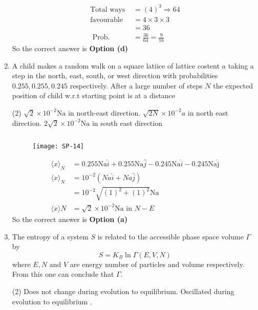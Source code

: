 \begin{enumerate}
	\begin{answer}
		\begin{align*}
		\text{Total ways }&=(4)^{3} \Rightarrow 64\\
		\text{favourable }&=4 \times 3 \times 3\\
		&=36\\
		\text { Prob. }&=\frac{36}{64}=\frac{9}{16}
		\end{align*}
		So the correct answer is \textbf{Option (d)}
	\end{answer}
	\item A child makes a random walk on a square latiice of lattice costent $a$ taking a step in the north, east, south, or west direction with probabilities $0.255,0.255,0.245$ respectively. After a large number of steps $N$ the expected position of child w.r.t starting point is at a distance
	\begin{tasks}(2)
		\task[\textbf{a.}]$\sqrt{2} \times 10^{-2} \mathrm{Na}$ in north-east direction.
		\task[\textbf{b.}]$\sqrt{2 N} \times 10^{-2} a$  in north east direction.
		\task[\textbf{c.}]$2 \sqrt{2} \times 10^{-2} \mathrm{Na}$ in south east direction
	\end{tasks}
	\begin{answer}$\left. \right. $
		\begin{figure}[H]
			\centering
			\texttt{[image: SP-14]}
		\end{figure}
		\begin{align*}
		\langle x\rangle_{N}&=0.255 \mathrm{Na}\hat{i}
		+0.255 \mathrm{Na} \hat{j}-0.245 \mathrm{Na} \hat{i}
		-0.245 \mathrm{Na\hat{j}}\\
		\langle x\rangle_{N}&=10^{-2}(Na \hat{i}+Na \hat { j })\\
		&=10^{-2} \sqrt{(1)^{2}+(1)^{2}} \mathrm{Na}\\
		\langle x\rangle N&=\sqrt{2} \times 10^{-2} \mathrm{Na} \text { in } N-E
		\end{align*}
		So the correct answer is \textbf{Option (a)}
	\end{answer}
	\item The entropy of a system $S$ is related to the accessible phase space volume $\Gamma$ by 
	$$S=K_{B} \ln \Gamma(E, V, N)$$
	where $E,N \text{ and }V$ are energy number of particles and volume respectively. From this one can conclude that $\Gamma$.
	\begin{tasks}(2)
		\task[\textbf{a.}]Does not change during evolution to equilibrium.
		\task[\textbf{b.}]Oscillated during evolution to equilibrium .

\end{tasks}
\end{enumerate}
